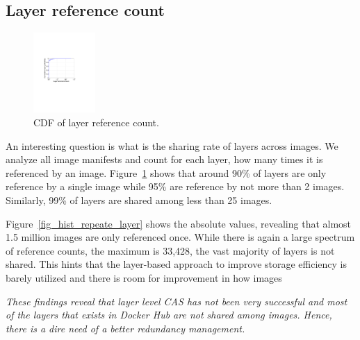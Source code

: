 \subsection{Layer reference count}

\begin{figure}
	\centering
	\includegraphics[width=0.21\textwidth]{graphs/shared-cnt-cdf.pdf}
	\caption{CDF of layer reference count.
	}
	\label{fig:ref_count}
\end{figure}

An interesting question is what is the sharing rate of layers across images.
We analyze all image manifests and count for each layer, how many times it is
referenced by an image. Figure~\ref{fig:ref_count} shows that around 90\% of
layers are only reference by a single image while 95\% are reference by not
more than 2 images. Similarly, 99\% of layers are shared among less than 25
images. 

Figure~\ref{fig_hist_repeate_layer} shows the absolute values, revealing that
almost 1.5 million images are only referenced once.   While there is again a large spectrum of reference counts, the maximum
is 33,428, the vast majority of layers is not shared. This hints that the
layer-based approach to improve storage efficiency is barely utilized and there
is room for improvement in how images

\emph{These findings reveal that layer level CAS has not been very successful
and most of the layers that exists in Docker Hub are not shared among images.
Hence, there is a dire need of a better redundancy management.}

